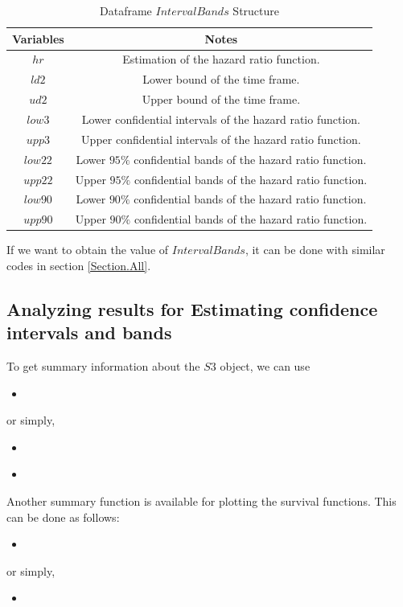 \documentclass[12pt]{article}
\newcommand{\insertcode}[2]{\begin{itemize}\item[]\end{itemize}} %
\begin{document}
\begin{table}[!h]
\renewcommand{\arraystretch}{1.3}
\caption{Dataframe $IntervalBands$ Structure} \label{Tab:EstimateStructure} \centering
\begin{tabular}{|c||c|}
  \hline
  Variables & Notes  \\
  \hline
  $hr$ & Estimation of the hazard ratio function.\\
  $ld2$ & Lower bound of the time frame. \\
  $ud2$ & Upper bound of the time frame.\\
  $low3$ & Lower confidential intervals of the hazard ratio function. \\
  $upp3$ & Upper confidential intervals of the hazard ratio function.\\
  $low22$ & Lower $95\%$ confidential bands of the hazard ratio function. \\
  $upp22$ & Upper $95\%$ confidential bands of the hazard ratio function. \\
  $low90$ & Lower $90\%$ confidential bands of the hazard ratio function.  \\
  $upp90$ & Upper $90\%$ confidential bands of the hazard ratio function. \\
  \hline
\end{tabular}
\end{table}

If we want to obtain the value of $IntervalBands$, it can be done with similar codes in section \ref{Section.All}.

\subsection{Analyzing results for Estimating confidence intervals and bands}
To get summary information about the $S3$ object, we can use
\insertcode{"Scripts/code16.pl"}{}
or simply,
\insertcode{"Scripts/code16s.pl"}{}
\insertcode{"Scripts/result16.pl"}{Results of scripts.}

Another summary function is available for plotting the survival functions. This can be done as follows:
\insertcode{"Scripts/code17.pl"}{}
or simply,
\insertcode{"Scripts/code17s.pl"}{Plotting estimates' results of confidence intervals and bands.}
\end{document}
